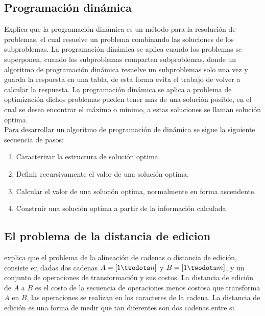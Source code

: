 \subsection{Programación dinámica}
\cite{Cormen2009} Explica que la programación dinámica es un método para la resolución de problemas, el cual resuelve un problema combinando las soluciones de los subproblemas. La programación dinámica se aplica cuando los problemas se superponen, cuando los subproblemas comparten subproblemas, donde un algoritmo de programación dinámica resuelve un subproblemas solo una vez y guarda la respuesta en una tabla, de esta forma evita el trabajo de volver a calcular la respuesta. La programación dinámica se aplica a problema de optimización dichos problemas pueden tener mas de una solución posible, en el cual se desea encontrar el máximo o mínimo, a estas soluciones se llaman solución optima.\\

\noindent Para desarrollar un algoritmo de programación de dinámica se sigue la siguiente secuencia de pasos:
\begin{enumerate}
    \item Caracterizar la estructura de solución optima.
    \item Definir recursivamente el valor de una solución optima.
    \item Calcular el valor de una solución optima, normalmente en forma ascendente.
    \item Construir una solución optima a partir de la información calculada.
\end{enumerate}

\subsection{El problema de la distancia de edicion}
\cite{Cormen2009} explica que el problema de la alineación de cadenas o distancia de edición, consiste en dadas dos cadenas $A=[1 \twodots n]$ y $B=[1 \twodots m]$, y un conjunto de operaciones de transformación y sus costos. La distancia de edición de $A$ a $B$ es el costo de la secuencia de operaciones menos costosa que transforma $A$ en $B$, las operaciones se realizan en los caracteres de la cadena. La distancia de edición es una forma de medir que tan diferentes son dos cadenas entre si.

